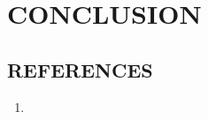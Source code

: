\documentclass[a4paper,12pt,oneside]{report}  %
\begin{document}
\chapter{CONCLUSION}

\newpage




\section{REFERENCES}
\begin{enumerate}
\item 

\end{enumerate}
\end{document}
